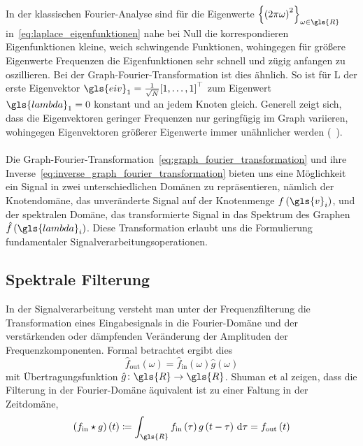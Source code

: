 In der klassischen Fourier-Analyse sind für die Eigenwerte ${\left\{{\left(2\pi \omega\right)}^2\right\}}_{\omega \in \gls{R}}$ in~\eqref{eq:laplace_eigenfunktionen} nahe bei Null die korrespondieren Eigenfunktionen kleine, weich schwingende Funktionen, wohingegen für größere Eigenwerte \bzw{} Frequenzen die Eigenfunktionen sehr schnell und zügig anfangen zu oszillieren.
Bei der Graph-Fourier-Transformation ist dies ähnlich.
So ist für \gls{L} der erste Eigenvektor $\gls{eiv}_1 = \frac{1}{\sqrt{N}}{\left[1, \ldots, 1\right]}^{\top}$ zum Eigenwert $\gls{lambda}_1 = 0$ konstant und an jedem Knoten gleich.
Generell zeigt sich, dass die Eigenvektoren geringer Frequenzen nur geringfügig im Graph variieren, wohingegen Eigenvektoren größerer Eigenwerte immer unähnlicher werden (\vgl{}~\cite{Shuman}).
\\\\
Die Graph-Fourier-Transformation~\eqref{eq:graph_fourier_transformation} und ihre Inverse~\eqref{eq:inverse_graph_fourier_transformation} bieten uns eine Möglichkeit ein Signal in zwei unterschiedlichen Domänen zu repräsentieren, nämlich der Knotendomäne, \dhe{} das unveränderte Signal auf der Knotenmenge $f\left(\gls{v}_i\right)$, und der spektralen Domäne, \dhe{} das transformierte Signal in das Spektrum des Graphen $\hat f\left(\gls{lambda}_i\right)$.
Diese Transformation erlaubt uns die Formulierung fundamentaler Signalverarbeitungsoperationen.

\subsection{Spektrale Filterung}
\label{spektrale_filterung}

In der Signalverarbeitung versteht man unter der Frequenzfilterung die Transformation eines Eingabesignals in die Fourier-Domäne und der verstärkenden oder dämpfenden Veränderung der Amplituden der Frequenzkomponenten.
Formal betrachtet ergibt dies
\begin{equation*}
  \hat f_{\mathrm{out}}\left(\omega\right) = \hat f_{\mathrm{in}}\left(\omega\right)\hat g\left(\omega\right)
\end{equation*}
mit Übertragungsfunktion $\hat g \colon \gls{R} \to \gls{R}$.
Shuman et al zeigen, dass die Filterung in der Fourier-Domäne äquivalent ist zu einer Faltung in der Zeitdomäne, \dhe{}
\begin{equation}
  \left(f_{\mathrm{in}} \star g\right)\left(t\right) \coloneqq \int_{\gls{R}} f_{\mathrm{in}}\left(\tau\right)g\left(t - \tau\right)\, \mathrm{d}\tau = f_{\mathrm{out}}\left(t\right)
\end{equation}

